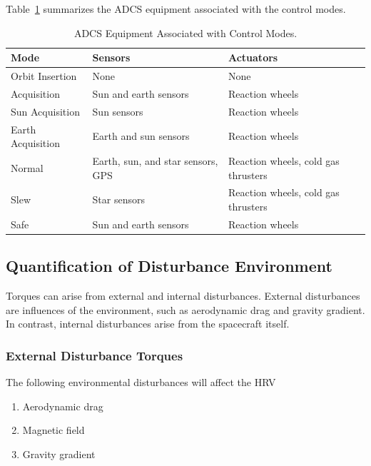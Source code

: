 \documentclass[paper=letter, fontsize=11pt]{scrartcl} %
\numberwithin{equation}{section} %
\numberwithin{figure}{section} %
\numberwithin{table}{section} %
\begin{document}
\bigskip Table~\ref{table:scctrl} summarizes the ADCS equipment associated with the control modes.

\begin{table}[H]
    \centering
    \begin{tabular}{l l l}
        \toprule
        Mode              & Sensors                           & Actuators                           \\
        \midrule
        Orbit Insertion   & None                              & None                                \\
        Acquisition       & Sun and earth sensors             & Reaction wheels                     \\
        Sun Acquisition   & Sun sensors                       & Reaction wheels                     \\
        Earth Acquisition & Earth and sun sensors             & Reaction wheels                     \\
        Normal            & Earth, sun, and star sensors, GPS & Reaction wheels, cold gas thrusters \\
        Slew              & Star sensors                      & Reaction wheels, cold gas thrusters \\
        Safe              & Sun and earth sensors             & Reaction wheels                     \\
        \bottomrule
    \end{tabular}
    \caption{ADCS Equipment Associated with Control Modes.}
    \label{table:scctrl}
\end{table}

\subsection{Quantification of Disturbance Environment}
\par Torques can arise from external and internal disturbances. External disturbances are influences of the environment, such as aerodynamic drag and gravity gradient. In contrast, internal disturbances arise from the spacecraft itself.

\subsubsection {External Disturbance Torques}
\par The following environmental disturbances will affect the HRV
\begin{enumerate}
    \item Aerodynamic drag
    \item Magnetic field
    \item Gravity gradient
\end{enumerate}
\end{document}
